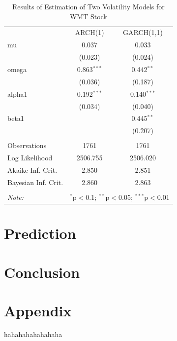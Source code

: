 \documentclass[paper=a4, fontsize=13pt]{article}
\begin{document}
\begin{table}[!htbp] \centering 
  \caption{Results of Estimation of Two Volatility Models for WMT Stock} 
  \label{est_WMT} 
\begin{tabular}{@{\extracolsep{5pt}}lcc} 
\\[-1.8ex]\hline 
\hline
 & ARCH(1) & GARCH(1,1) \\ 
 mu & 0.037 & 0.033 \\ 
  & (0.023) & (0.024) \\ 
 omega & 0.863$^{***}$ & 0.442$^{**}$ \\ 
  & (0.036) & (0.187) \\ 
 alpha1 & 0.192$^{***}$ & 0.140$^{***}$ \\ 
  & (0.034) & (0.040) \\ 
 beta1 &  & 0.445$^{**}$ \\ 
  &  & (0.207) \\ 
\hline \\[-1.8ex] 
Observations & 1761 & 1761 \\ 
Log Likelihood & 2506.755 & 2506.020 \\ 
Akaike Inf. Crit. & 2.850 & 2.851 \\ 
Bayesian Inf. Crit. & 2.860 & 2.863 \\ 
\hline 
\hline \\[-1.8ex] 
\textit{Note:}  & \multicolumn{2}{r}{$^{*}$p$<$0.1; $^{**}$p$<$0.05; $^{***}$p$<$0.01} \\ 
\end{tabular} 
\end{table} 

\section{Prediction}

\section{Conclusion}

\section{Appendix}

\begin{thebibliography}{99}
 hahahahahahahaha
\end{thebibliography}
\end{document}
